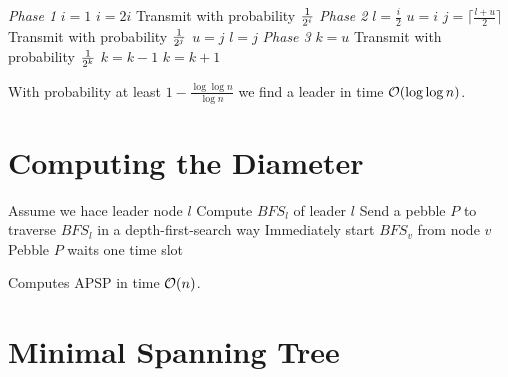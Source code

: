 \documentclass[11pt, oneside]{book}   						%
\begin{document}
\begin{algorithm}[H]
\caption{}\label{fastuniformleadercd}
\begin{algorithmic}[1]
\Statex\textit{Phase 1}
\State $i=1$
\Repeat
	\State $i=2i$
	\State Transmit with probability $\frac{1}{2^i}$
\Statex
\Statex\textit{Phase 2}
\State $l=\frac{i}{2}$
\State $u=i$
	\State $j=\lceil\frac{l+u}{2}\rceil$
	\State Transmit with probability $\frac{1}{2^j}$
		\State $u=j$
	\Else
		\State $l=j$
	\EndIf
\EndWhile
\Statex
\Statex\textit{Phase 3}
\State $k=u$
\Repeat
	\State Transmit with probability $\frac{1}{2^k}$
		\State $k=k-1$
	\Else
		\State $k=k+1$
	\EndIf
{}
\end{algorithmic}
\end{algorithm}
\begin{mythm} With probability at least $1-\frac{\log\log n}{\log n}$ we find a leader in time $\mathcal{O}(\log\log n)$.\end{mythm}

\section{Computing the Diameter}
\textbf{}
\begin{algorithm}[H]
\caption{}\label{apsp}
\begin{algorithmic}[1]
\State Assume we hace leader node $l$
\State Compute $BFS_l$ of leader $l$
\State Send a pebble $P$ to traverse $BFS_l$ in a depth-first-search way
		\State Immediately start $BFS_v$ from node $v$
		\State Pebble $P$ waits one time slot
	\EndIf
\EndWhile
\end{algorithmic}
\end{algorithm}
\begin{mythm} Computes APSP in time $\mathcal{O}(n)$.\end{mythm}

\section{Minimal Spanning Tree}
\textbf{}
\end{document}
